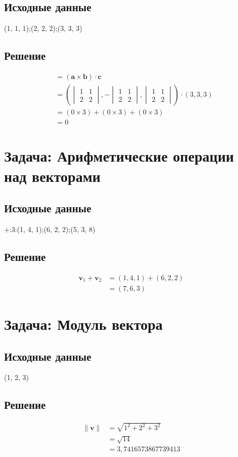 \documentclass{article}
\begin{document}
\subsection{Исходные данные}
(1, 1, 1);(2, 2, 2);(3, 3, 3)
\subsection{Решение}
\begin{align*}
[\mathbf{a}, \mathbf{b}, \mathbf{c}] &= (\mathbf{a} \times \mathbf{b}) \cdot \mathbf{c} \\
&= \left(\begin{vmatrix} 1 & 1 \\ 2 & 2 \end{vmatrix}, -\begin{vmatrix} 1 & 1 \\ 2 & 2 \end{vmatrix}, \begin{vmatrix} 1 & 1 \\ 2 & 2 \end{vmatrix}\right) \cdot (3, 3, 3) \\
&= (0 \times 3) + (0 \times 3) + (0 \times 3) \\
&= 0
\end{align*}
\section{Задача: Арифметические операции над векторами}
\subsection{Исходные данные}
+:3:(1, 4, 1);(6, 2, 2);(5, 3, 8)
\subsection{Решение}
\begin{align*}
\mathbf{v}_1 + \mathbf{v}_2 &= (1, 4, 1) + (6, 2, 2) \\&= (7, 6, 3)
\end{align*}
\section{Задача: Модуль вектора}
\subsection{Исходные данные}
(1, 2, 3)
\subsection{Решение}
\begin{align*}
\|\mathbf{v}\| &= \sqrt{ 1^2 + 2^2 + 3^2 } \\
&= \sqrt{ 14 } \\
&= 3,7416573867739413
\end{align*}
\end{document}
